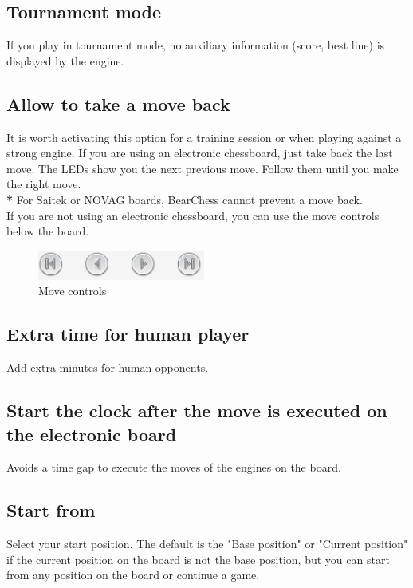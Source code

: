 \documentclass[11pt,a4paper]{article}
\begin{document}
\subsection{Tournament mode}
If you play in tournament mode, no auxiliary information (score, best line) is displayed by the engine.

\subsection{Allow to take a move back}
It is worth activating this option for a training session or when playing against a strong engine. If you are using an electronic chessboard, just take back the last move. The LEDs show you the next previous move. Follow them until you make the right move.\\
{\color{red}\textbf{*}} For Saitek or NOVAG boards, BearChess cannot prevent a move back.\\
If you are not using an electronic chessboard, you can use the move controls below the board.

\begin{figure}[H]
	\centering
	\includegraphics[scale=1.0]{MoveControl.png}
	\caption{Move controls}
	\label{fig:MoveControl}
\end{figure}


\subsection{Extra time for human player}
Add extra minutes for human opponents.

\subsection{Start the clock after the move is executed on the electronic board}
Avoids a time gap to execute the moves of the engines on the board.


\subsection{Start from}
Select your start position. The default is the "Base position" or "Current position" if the current position on the board is not the base position, but you can start from any position on the board or continue a game.
\end{document}
